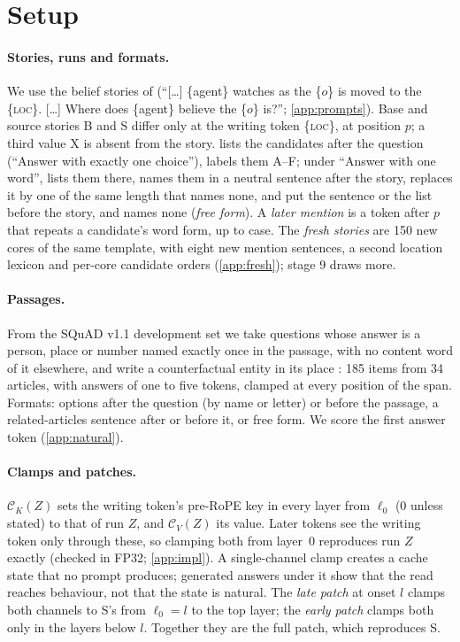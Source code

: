 \section{Setup}\label{sec:method}

\paragraph{Stories, runs and formats.}
We use the belief stories of \citet{anonymous2026fitted} (``[\dots] \{agent\} watches as the \{$o$\} is moved to the \{\textsc{loc}\}. [\dots] Where does \{agent\} believe the \{$o$\} is?''; \cref{app:prompts}). Base and source stories B and S differ only at the writing token \{\textsc{loc}\}, at position $p$; a third value X is absent from the story. \fmtOpt{} lists the candidates after the question (``Answer with exactly one choice''), \fmtLetter{} labels them A--F; under ``Answer with one word'', \fmtListA{} lists them there, \fmtPost{} names them in a neutral sentence after the story, \fmtNull{} replaces it by one of the same length that names none, \fmtSentB{} and \fmtBefore{} put the sentence or the list before the story, and \fmtNone{} names none (\emph{free form}). A \emph{later mention} is a token after $p$ that repeats a candidate's word form, up to case. The \emph{fresh stories} are 150 new cores of the same template, with eight new mention sentences, a second location lexicon and per-core candidate orders (\cref{app:fresh}); stage 9 draws \NqStories{} more.

\paragraph{Passages.}
From the SQuAD v1.1 development set \citep{rajpurkar2016squad} we take questions whose answer is a person, place or number named exactly once in the passage, with no content word of it elsewhere, and write a counterfactual entity in its place \citep{longpre2021conflicts}: 185 items from 34 articles, with answers of one to five tokens, clamped at every position of the span. Formats: options after the question (by name or letter) or before the passage, a related-articles sentence after or before it, or free form. We score the first answer token (\cref{app:natural}).

\paragraph{Clamps and patches.}
$\mathcal{C}_K(Z)$ sets the writing token's pre-RoPE key in every layer from $\ell_0$ ($0$ unless stated) to that of run $Z$, and $\mathcal{C}_V(Z)$ its value. Later tokens see the writing token only through these, so clamping both from layer~0 reproduces run $Z$ exactly (checked in FP32; \cref{app:impl}). A single-channel clamp creates a cache state that no prompt produces; generated answers under it show that the read reaches behaviour, not that the state is natural. The \emph{late patch} at onset $l$ clamps both channels to S's from $\ell_0 = l$ to the top layer; the \emph{early patch} clamps both only in the layers below $l$. Together they are the full patch, which reproduces S.

